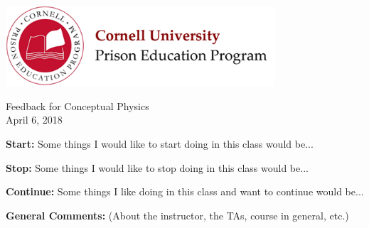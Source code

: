 \documentclass[11pt]{exam}
\begin{document}

\begin{center}
~
\vspace{1in}

\includegraphics[width=10cm]{../images/logo.png}

{\LARGE Feedback for Conceptual Physics \\ April 6, 2018 \\}
\end{center}

\clearpage

\noindent\textbf{Start:} Some things I would like to start doing in this class would be...
\fillwithlines{2in}
\vspace{0.2in}

\noindent\textbf{Stop:} Some things I would like to stop doing in this class would be...
\fillwithlines{2in}
\vspace{0.2in}

\noindent\textbf{Continue:} Some things I like doing in this class and want to continue would be...
\fillwithlines{2in}
\vspace{0.2in}

\noindent\textbf{General Comments:} (About the instructor, the TAs, course in general, etc.)
\fillwithlines{2in}
\end{document}
